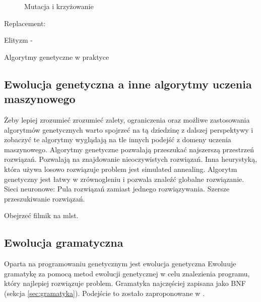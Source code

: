 \begin{figure}[h]
	\caption{\label{fig:mutation-and-crossover-operations}Mutacja i krzyżowanie}
\end{figure}

Replacement:

Elityzm -

Algorytmy genetyczne w praktyce

 
  
\subsection{Ewolucja genetyczna a inne algorytmy uczenia maszynowego}
Żeby lepiej zrozumieć zrozumieć zalety, ograniczenia oraz możliwe zastosowania algorytmów genetycznych warto spojrzeć na tą dziedzinę z dalszej perspektywy i zobaczyć te algorytmy wyglądają na tle innych podejść z domeny uczenia maszynowego.
Algorytmy genetyczne pozwalają przeszukać najszerszą przestrzeń rozwiązań. Pozwalają na znajdowanie nieoczywistych rozwiązań.  
Inna heurystyką, która używa losowo rozwiązuje problem jest simulated annealing. Algorytm genetyczny jest łatwy w zrównogleniu i pozwala znaleźć globalne rozwiązanie.
Sieci neuronowe:
Pula rozwiązań zamiast jednego rozwiązywania. Szersze przeszukiwanie rozwiązań. 

Obejrzeć filmik na mlst.
\subsection{Ewolucja gramatyczna}
Oparta na programowaniu genetycznym jest ewolucja genetyczna 
Ewoluuje gramatykę za pomocą metod ewolucji genetycznej w celu znalezienia programu, który najlepiej rozwiązuje problem. Gramatyka najczęściej zapisana jako BNF (sekcja \ref{sec:gramatyka}). 
Podejście to zostało zaproponowane w \cite{ryan_collins_neill_1998}. 

